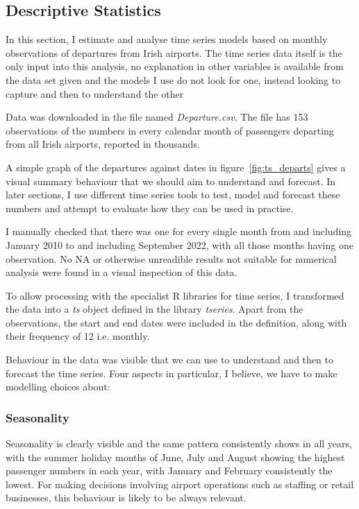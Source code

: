 \documentclass[9pt,technote]{IEEEtran}
\begin{document}
\subsection{Descriptive Statistics}

In this section, I estimate and analyse time series models based on monthly observations of departures from Irish airports.  The time series data itself is the only input into this analysis, no explanation in other variables is available from the data set given and the models I use do not look for one, instead looking to capture and then to understand the other

Data was downloaded in the file named \textit{Departure.csv}.  The file has 153 observations of the numbers in every calendar month of passengers departing from all Irish airports, reported in thousands.  

A simple graph of the departures against dates in figure~\ref{fig:ts_departs} gives a visual summary behaviour that we should aim to understand and forecast. In later sections, I use different time series tools to test, model and forecast these numbers and attempt to evaluate how they can be used in practise.  

I manually checked that there was one for every single month from and including January 2010 to and including September 2022, with all those months having one observation. No NA or otherwise unreadible results not suitable for numerical analysis were found in a visual inspection of this data. 

To allow processing with the specialist R libraries for time series, I transformed the data into a \textit{ts} object defined in the library \textit{tseries}.  Apart from the observations, the start and end dates were included in the definition, along with their frequency of 12 i.e. monthly.  


Behaviour in the data was visible that we can use to understand and then to forecast the time series.  Four aspects in particular, I believe, we have to make modelling choices about: 

\subsubsection{Seasonality}Seasonality is clearly visible and the same pattern consistently shows in all years, with the summer holiday months of June, July and August showing the highest passenger numbers in each year, with January and February consistently the lowest.  For making decisions involving airport operations such as staffing or retail businesses, this behaviour is likely to be always relevant.  
\end{document}
